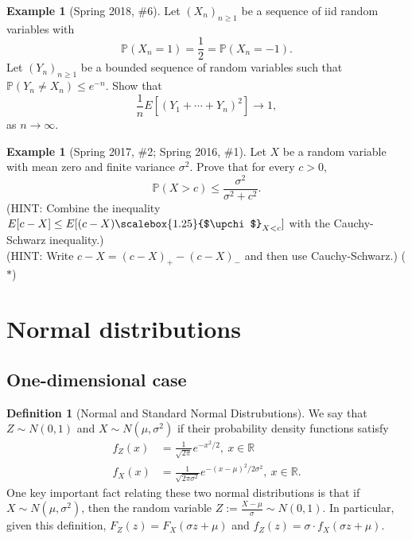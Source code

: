 \documentclass[12pt,reqno]{article}
\theoremstyle{plain}
\theoremstyle{definition}
\newtheorem{definition}[theorem]{Definition}
\newtheorem{example}[theorem]{Example}
\newcommand{\PP}[1]{\ensuremath{\mathbb{P}\left(#1\right)}}
\renewcommand{\chi}{\scalebox{1.25}{$\upchi$}}
\begin{document}
\begin{example}[Spring 2018, \#6]
Let $(X_n)_{n \geq 1}$ be a sequence of iid random variables with 
\[
\PP{X_n = 1} = \frac{1}{2} = \PP{X_n = -1}. 
\]
Let $(Y_n)_{n \geq 1}$ be a bounded sequence of random variables such that 
$\PP{Y_n \neq X_n} \leq e^{-n}$. Show that 
\[
\frac{1}{n} E[(Y_1+\cdots+Y_n)^2] \longrightarrow 1, 
\]
as $n \rightarrow \infty$. 
\end{example} 

\begin{example}[Spring 2017, \#2; Spring 2016, \#1]
Let $X$ be a random variable with mean zero and finite variance $\sigma^2$. 
Prove that for every $c > 0$, 
\[
\PP{X > c} \leq \frac{\sigma^2}{\sigma^2+c^2}. 
\]
(HINT: Combine the inequality $E[c-X] \leq E[(c-X)\chi_{X < c}]$ with the 
Cauchy-Schwarz inequality.) \\ 
(HINT: Write $c-X = (c-X)_{+} - (c-X)_{-}$ and then use Cauchy-Schwarz.) 
($\ast$) 
\end{example} 

\newpage 
\section{Normal distributions} 
\label{Section_NormalRVs} 

\subsection{One-dimensional case}

\begin{definition}[Normal and Standard Normal Distrubutions]
We say that $Z \sim N(0, 1)$ and $X \sim N(\mu, \sigma^2)$ if their 
probability density functions satisfy
\begin{align*} 
f_{Z}(x) & = \frac{1}{\sqrt{2\pi}} e^{-x^2/2},\ x \in \mathbb{R} \\ 
f_{X}(x) & = \frac{1}{\sqrt{2\pi\sigma^2}} e^{-(x-\mu)^2 / 2\sigma^2},\ 
     x \in \mathbb{R}. 
\end{align*} 
One key important fact relating these two normal distributions is that if 
$X \sim N(\mu,\sigma^2)$, then the random variable 
$Z := \frac{X-\mu}{\sigma} \sim N(0, 1)$. In particular, 
given this definition, $F_Z(z) = F_X(\sigma z+\mu)$ and 
$f_Z(z) = \sigma \cdot f_X(\sigma z+\mu)$. 
\end{definition} 
\end{document}
